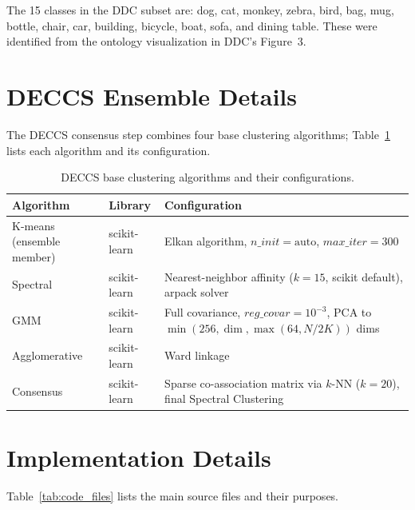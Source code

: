 The 15 classes in the DDC subset are: dog, cat, monkey, zebra, bird, bag, mug, bottle, chair, car, building, bicycle, boat, sofa, and dining table. These were identified from the ontology visualization in DDC's Figure~3.

\section{DECCS Ensemble Details}

The DECCS consensus step combines four base clustering algorithms; Table~\ref{tab:ensemble_details} lists each algorithm and its configuration.

\begin{table}[H]
\centering
\caption{DECCS base clustering algorithms and their configurations.}
\label{tab:ensemble_details}
\begin{tabular}{llp{7cm}}
\toprule
\textbf{Algorithm} & \textbf{Library} & \textbf{Configuration} \\
\midrule
K-means (ensemble member) & scikit-learn & Elkan algorithm, $n\_init = \text{auto}$, $max\_iter = 300$ \\
Spectral & scikit-learn & Nearest-neighbor affinity ($k = 15$, scikit default), arpack solver \\
GMM & scikit-learn & Full covariance, $reg\_covar = 10^{-3}$, PCA to $\min(256, \dim, \max(64, N/2K))$ dims \\
Agglomerative & scikit-learn & Ward linkage \\
\midrule
Consensus & scikit-learn & Sparse co-association matrix via $k$-NN ($k = 20$), final Spectral Clustering \\
\bottomrule
\end{tabular}
\end{table}


\section{Implementation Details}

Table~\ref{tab:code_files} lists the main source files and their purposes.

